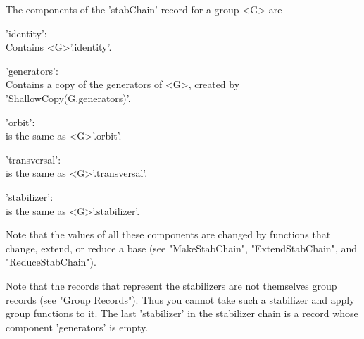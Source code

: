 The components of the 'stabChain' record for a group <G> are

'identity': \\
	Contains <G>'.identity'.

'generators': \\
	Contains a copy of the generators of <G>, created by
	'ShallowCopy(G.generators)'.

'orbit': \\
	is the same as <G>'.orbit'.

'transversal': \\
	is the same as <G>'.transversal'.

'stabilizer': \\
	is the same as <G>'.stabilizer'.
	
Note  that the values of all these components are  changed by functions  that
change, extend, or reduce a base (see "MakeStabChain", "ExtendStabChain",
and "ReduceStabChain").

Note that the records that represent  the stabilizers are  not themselves
group  records  (see  "Group  Records").   Thus  you  cannot take such  a
stabilizer and apply group functions to it.  The last 'stabilizer' in the
stabilizer chain is a record whose component 'generators' is empty.


